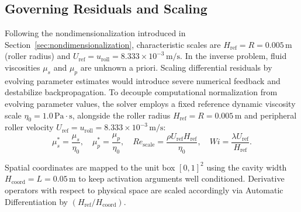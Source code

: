 \subsection{Governing Residuals and Scaling}
\label{subsec:governing_residuals_scaling}

Following the nondimensionalization introduced in Section~\ref{sec:nondimensionalization},
characteristic scales are $H_{\mathrm{ref}} = R = 0.005\,\mathrm{m}$ (roller radius)
and $U_{\mathrm{ref}} = u_{\mathrm{roll}} = 8.333 \times 10^{-3}\,\mathrm{m/s}$.
In the inverse problem, fluid viscosities $\mu_s$ and $\mu_p$ are unknown a priori.
Scaling differential residuals by evolving parameter estimates would introduce severe numerical feedback
and destabilize backpropagation. To decouple computational normalization from evolving parameter values,
the solver employs a fixed reference dynamic viscosity scale $\eta_0 = 1.0\,\mathrm{Pa\cdot s}$, alongside
the roller radius $H_{\mathrm{ref}} = R = 0.005\,\mathrm{m}$ and peripheral roller velocity
$U_{\mathrm{ref}} = u_{\mathrm{roll}} = 8.333 \times 10^{-3}\,\mathrm{m/s}$:
\begin{equation}
    \mu_s^* = \frac{\mu_s}{\eta_0}, \quad \mu_p^* = \frac{\mu_p}{\eta_0}, \quad Re_{\mathrm{scale}} = 
    \frac{\rho U_{\mathrm{ref}} H_{\mathrm{ref}}}{\eta_0}, \quad Wi = \frac{\lambda U_{\mathrm{ref}}}{H_{\mathrm{ref}}} .
    \label{eq:nondim_scaling_implementation}
\end{equation}

Spatial coordinates are mapped to the unit box $[0, 1]^2$ using the cavity width
$H_{\mathrm{coord}} = L = 0.05\,\mathrm{m}$ to keep activation arguments well
conditioned. Derivative operators with respect to physical space are scaled
accordingly via Automatic Differentiation by $(H_{\mathrm{ref}} / H_{\mathrm{coord}})$.

